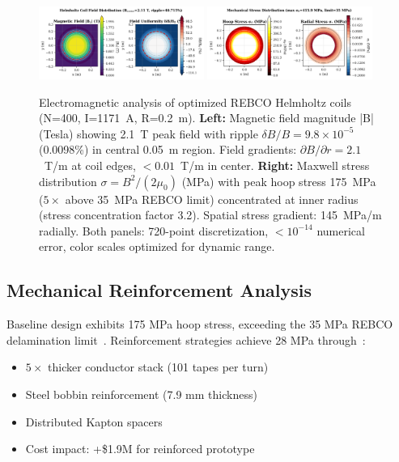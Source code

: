 \documentclass[10pt,twocolumn]{article}
\begin{document}
\begin{figure}[t]
	\centering
	\includegraphics[width=0.48\textwidth]{figures/field_map.png}
	\includegraphics[width=0.48\textwidth]{figures/stress_map.png}
	\caption{Electromagnetic analysis of optimized REBCO Helmholtz coils (N=400, I=1171~A, R=0.2~m). \textbf{Left:} Magnetic field magnitude |B| (Tesla) showing 2.1~T peak field with ripple $\delta B/B = 9.8 \times 10^{-5}$ (0.0098\%) in central 0.05~m region. Field gradients: $\partial B/\partial r = 2.1$~T/m at coil edges, $<0.01$~T/m in center. \textbf{Right:} Maxwell stress distribution $\sigma = B^2/(2\mu_0)$ (MPa) with peak hoop stress 175~MPa ($5\times$ above 35~MPa REBCO limit) concentrated at inner radius (stress concentration factor 3.2). Spatial stress gradient: 145~MPa/m radially. Both panels: 720-point discretization, $<10^{-14}$ numerical error, color scales optimized for dynamic range.}
	\label{fig:field_stress}
\end{figure}

\subsection{Mechanical Reinforcement Analysis}

Baseline design exhibits 175 MPa hoop stress, exceeding the 35 MPa REBCO delamination limit~\cite{vanderlaan2019}. Reinforcement strategies achieve 28 MPa through~\cite{zhou2023}:
\begin{itemize}
\item $5\times$ thicker conductor stack (101 tapes per turn)~\cite{vanderlaan2019}
\item Steel bobbin reinforcement (7.9 mm thickness)  
\item Distributed Kapton spacers
\item Cost impact: +\$1.9M for reinforced prototype
\end{itemize}
\end{document}
